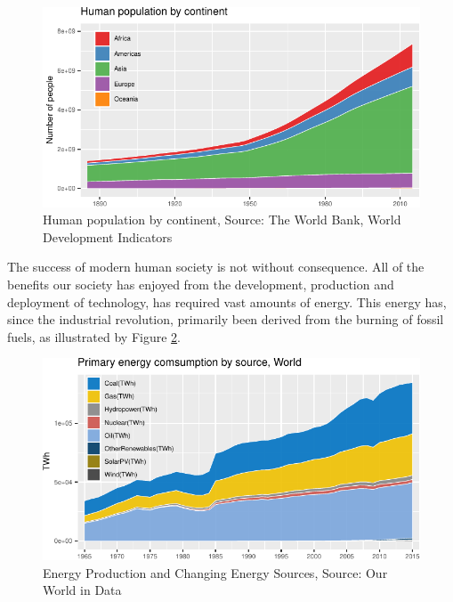 \documentclass[11pt,]{article}
\begin{document}
\begin{figure}[H]

{\centering \includegraphics{MD_Final_files/figure-latex/populationGrowthPlot-1} 

}

\caption{Human population by continent, Source: The World Bank, World Development Indicators}\label{fig:populationGrowthPlot}
\end{figure}

The success of modern human society is not without consequence. All of
the benefits our society has enjoyed from the development, production
and deployment of technology, has required vast amounts of energy. This
energy has, since the industrial revolution, primarily been derived from
the burning of fossil fuels, as illustrated by Figure
\ref{fig:globalEnergyPlot}.

\begin{figure}[H]

{\centering \includegraphics{MD_Final_files/figure-latex/globalEnergyPlot-1} 

}

\caption{Energy Production and Changing Energy Sources, Source: Our World in Data}\label{fig:globalEnergyPlot}
\end{figure}
\end{document}
